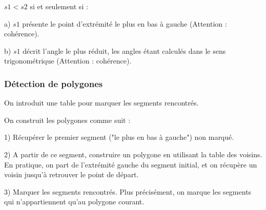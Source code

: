 \documentclass{article}
\begin{document}
$s1 < s2$ si et seulement si :

a) $s1$ présente le point d’extrémité le plus en bas à gauche (Attention : cohérence).

b) $s1$ décrit l'angle le plus réduit, les angles étant calculés dans le sens trigonométrique (Attention : cohérence).

\subsubsection{Détection de polygones}

On introduit une table pour marquer les segments rencontrés.

On construit les polygones comme suit :

1) Récupérer le premier segment ("le plus en bas à gauche") non marqué.

2) A partir de ce segment, construire un polygone en utilisant la table des voisins. En pratique, on part de l'extrémité gauche du segment initial, et on récupère un voisin jusqu'à retrouver le point de départ.

3) Marquer les segments rencontrés. Plus précisément, on marque les segments qui n'appartiennent qu'au polygone courant.
\end{document}
